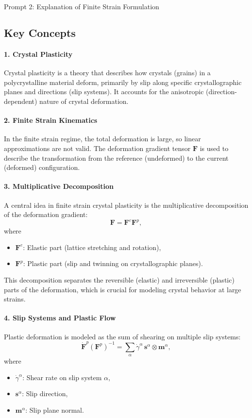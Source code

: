 \documentclass[12pt]{article}
\begin{document}
\begin{summary}{Prompt 2: Explanation of Finite Strain Formulation}
\subsection*{Key Concepts}

\paragraph{1. Crystal Plasticity}
Crystal plasticity is a theory that describes how crystals (grains) in a
polycrystalline material deform, primarily by slip along specific
crystallographic planes and directions (slip systems). It accounts for the
anisotropic (direction-dependent) nature of crystal deformation.

\paragraph{2. Finite Strain Kinematics}
In the finite strain regime, the total deformation is large, so linear
approximations are not valid. The deformation gradient tensor $\mathbf{F}$ is
used to describe the transformation from the reference (undeformed) to the
current (deformed) configuration.

\paragraph{3. Multiplicative Decomposition}
A central idea in finite strain crystal plasticity is the multiplicative
decomposition of the deformation gradient:
\begin{equation}
    \mathbf{F} = \mathbf{F}^e \mathbf{F}^p,
\end{equation}
where
\begin{itemize}
  \item $\mathbf{F}^e$: Elastic part (lattice stretching and rotation),
  \item $\mathbf{F}^p$: Plastic part (slip and twinning on crystallographic planes).
\end{itemize}
This decomposition separates the reversible (elastic) and irreversible (plastic)
parts of the deformation, which is crucial for modeling crystal behavior at
large strains.

\paragraph{4. Slip Systems and Plastic Flow}
Plastic deformation is modeled as the sum of shearing on multiple slip systems:
\begin{equation}
    \dot{\mathbf{F}}^p (\mathbf{F}^p)^{-1}
    = \sum_{\alpha} \dot{\gamma}^{\alpha}\,
      \mathbf{s}^{\alpha} \otimes \mathbf{m}^{\alpha},
\end{equation}
where
\begin{itemize}
  \item $\dot{\gamma}^{\alpha}$: Shear rate on slip system $\alpha$,
  \item $\mathbf{s}^{\alpha}$: Slip direction,
  \item $\mathbf{m}^{\alpha}$: Slip plane normal.
\end{itemize}


\end{summary}
\end{document}
